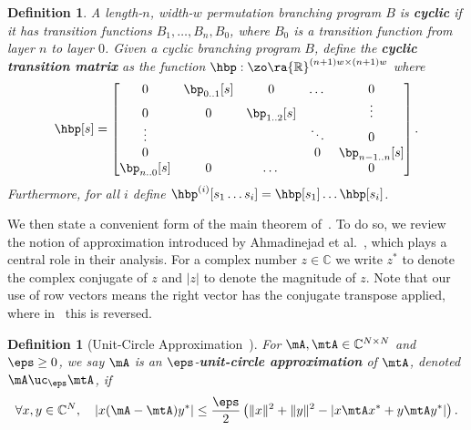 \documentclass[11pt]{article}
\newtheorem{definition}[theorem]{Definition}
\newcommand{\R}{{\mathbb R}}
\newcommand{\C}{{\mathbb C}}
\begin{document}
\begin{definition}
    A length-$n$, width-$w$ permutation branching program $B$ is \textbf{cyclic} if it has transition functions $B_1,\ldots,B_n,B_0$, where $B_0$ is a transition function from layer $n$ to layer $0$. Given a cyclic branching program $B$, define the \textbf{cyclic transition matrix} as the function $\hbp:\zo\ra \R^{(n+1)w\times(n+1)w}$ where
    \[\hbp[s] = \begin{bmatrix}
    0 & \bp_{0..1}[s] & 0 & \dots & 0\\
    0 & 0 & \bp_{1..2}[s] &  & \vdots\\
    \vdots & &  & \ddots & 0\\
    0 & ~ &   & 0 & \bp_{n-1..n}[s]\\
    \bp_{n..0}[s] & 0 & \dots & & 0\\
    \end{bmatrix}.\]
    Furthermore, for all $i$ define $\hbp^{(i)}[s_1\dots s_i]=\hbp[s_1]\dots\hbp[s_i]$.
\end{definition}
    
We then state a convenient form of the main theorem of~\cite{HozaPyVa21}. To do so, we review the notion of approximation introduced by Ahmadinejad et al.~\cite{AhmadinejadKeMuPeSiVa19}, which plays a central role in their analysis.
For a complex number $z \in \C$ we write $z^*$ to denote the complex conjugate of $z$ and $|z|$ to denote the magnitude of $z$. Note that our use of row vectors means the right vector has the conjugate transpose applied, where in~\cite{AhmadinejadKeMuPeSiVa19} this is reversed.

\begin{definition}[Unit-Circle Approximation~\cite{AhmadinejadKeMuPeSiVa19}]
    For $\mA,\mtA \in \C^{N\times N}$ and $\eps\geq 0$, we say $\mA$ is an $\eps$-\textbf{unit-circle approximation} of $\mtA$, denoted $\mA\uc_\eps \mtA$, if
    \[ \forall x,y \in \C^N, \quad \left|x(\mA-\mtA)y^*\right| \leq \frac{\eps}{2}\left(\|x\|^2+\|y\|^2-\left|x\mtA x^*+y\mtA y^*\right|\right).\]
\end{definition}
    
\end{document}
